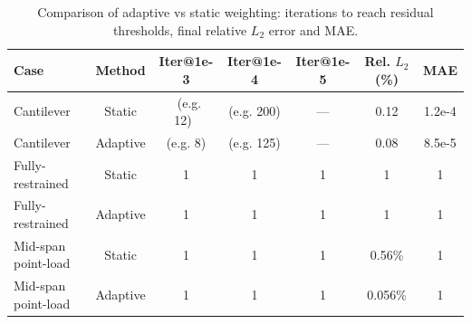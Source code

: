 \documentclass[twocolumn]{svjour3}
\begin{document}

	\begin{table}[htbp]
	\centering
	\caption{Comparison of adaptive vs static weighting: iterations to reach residual thresholds, final relative $L_2$ error and MAE.}
	\label{tab:adaptive_vs_static}
	\begin{tabular}{lcccccc}
	\toprule
	Case & Method & Iter@1e-3 & Iter@1e-4 & Iter@1e-5 & Rel. $L_2$ (\%) & MAE \\
	\midrule
	Cantilever & Static &  \ (e.g. 12)\  & (e.g. 200) & --- & 0.12 & 1.2e-4 \\
	Cantilever & Adaptive &  \ (e.g. 8)\  & (e.g. 125) & --- & 0.08 & 8.5e-5 \\
	\midrule
	Fully-restrained & Static & 1 & 1 & 1 & 1 & 1 \\
	Fully-restrained & Adaptive & 1 & 1 & 1 & 1 & 1 \\
	\midrule
	Mid-span point-load & Static & 1 & 1 & 1 & 0.56\% & 1 \\
	Mid-span point-load & Adaptive & 1 & 1 & 1 & 0.056\% & 1 \\
	\bottomrule
	\end{tabular}
	\end{table}
\end{document}
